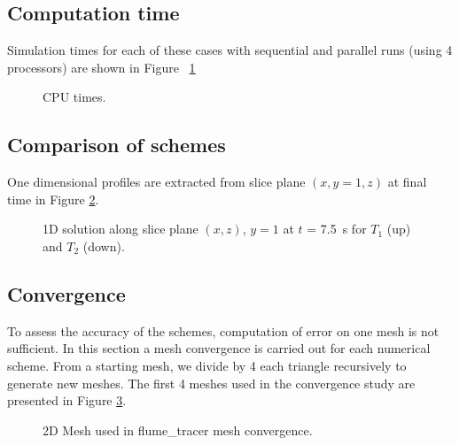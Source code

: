 \subsection{Computation time}

Simulation times for each of these cases with sequential and parallel runs
(using 4 processors) are shown in Figure ~\ref{fig:flumetracer:cputime}

\begin{figure}[H]
  \centering
  \caption{CPU times.}\label{fig:flumetracer:cputime}
\end{figure}


\subsection{Comparison of schemes}

One dimensional profiles are extracted from slice plane $(x,y=1,z)$ at final
time in Figure \ref{t2d:flumetracer:1dslice}.

\begin{figure}[H]
\centering
{}
\centering
{}
\caption{1D solution along slice plane $(x,z)$, $y=1$ at $t$ = 7.5~s for $T_1$ (up) and $T_2$ (down).}
\label{t2d:flumetracer:1dslice}
\end{figure}


\newpage
\subsection{Convergence}
To assess the accuracy of the schemes, computation of error on one mesh is not
sufficient.
In this section a mesh convergence is carried out for each numerical scheme.
From a starting mesh, we divide by 4 each triangle recursively to generate new
meshes.
The first 4 meshes used in the convergence study are presented in Figure
\ref{t2d:flumetracer:meshes}.

\begin{figure}[h!]
\begin{minipage}[t]{0.9\textwidth}
 \centering
\end{minipage}
\begin{minipage}[t]{0.9\textwidth}
 \centering
\end{minipage}
\begin{minipage}[t]{0.9\textwidth}
 \centering
\end{minipage}
\begin{minipage}[t]{0.9\textwidth}
 \centering
\end{minipage}
 \caption{2D Mesh used in flume\_tracer mesh convergence.}
 \label{t2d:flumetracer:meshes}
\end{figure}

